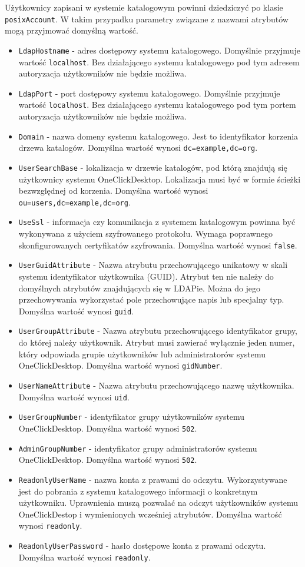 \documentclass[../opis-rozwiazania.tex]{subfiles}
\begin{document}
Użytkownicy zapisani w systemie katalogowym powinni dziedziczyć po klasie \texttt{posixAccount}. W takim przypadku parametry związane z nazwami atrybutów mogą przyjmować domyślną wartość.
\begin{itemize}
  \item \texttt{LdapHostname} - adres dostępowy systemu katalogowego. Domyślnie przyjmuje wartość \texttt{localhost}. Bez działającego systemu katalogowego pod tym adresem autoryzacja użytkowników nie będzie możliwa.
  \item \texttt{LdapPort} - port dostępowy systemu katalogowego. Domyślnie przyjmuje wartość \texttt{localhost}. Bez działającego systemu katalogowego pod tym portem autoryzacja użytkowników nie będzie możliwa.
  \item \texttt{Domain} - nazwa domeny systemu katalogowego. Jest to identyfikator korzenia drzewa katalogów. Domyślna wartość wynosi \texttt{dc=example,dc=org}.
  \item \texttt{UserSearchBase} - lokalizacja w drzewie katalogów, pod którą znajdują się użytkownicy systemu OneClickDesktop. Lokalizacja musi być w formie ścieżki bezwzględnej od korzenia. Domyślna wartość wynosi \texttt{ou=users,dc=example,dc=org}.
  \item \texttt{UseSsl} - informacja czy komunikacja z systemem katalogowym powinna być wykonywana z użyciem szyfrowanego protokołu. Wymaga poprawnego skonfigurowanych certyfikatów szyfrowania. Domyślna wartość wynosi \texttt{false}.
  \item \texttt{UserGuidAttribute} - Nazwa atrybutu przechowującego unikatowy w skali systemu identyfikator użytkownika (GUID). Atrybut ten nie należy do domyślnych atrybutów znajdujących się w LDAPie. Można do jego przechowywania wykorzystać pole przechowujące napis lub specjalny typ. Domyślna wartość wynosi \texttt{guid}.
  \item \texttt{UserGroupAttribute} - Nazwa atrybutu przechowującego identyfikator grupy, do której należy użytkownik. Atrybut musi zawierać wyłącznie jeden numer, który odpowiada grupie użytkowników lub administratorów systemu OneClickDesktop. Domyślna wartość wynosi \texttt{gidNumber}.
  \item \texttt{UserNameAttribute} - Nazwa atrybutu przechowującego nazwę użytkownika. Domyślna wartość wynosi \texttt{uid}.
  \item \texttt{UserGroupNumber} - identyfikator grupy użytkowników systemu OneClickDesktop. Domyślna wartość wynosi \texttt{502}.
  \item \texttt{AdminGroupNumber} - identyfikator grupy administratorów systemu OneClickDesktop. Domyślna wartość wynosi \texttt{502}.
  \item \texttt{ReadonlyUserName} - nazwa konta z prawami do odczytu. Wykorzystywane jest do pobrania z systemu katalogowego informacji o konkretnym użytkowniku. Uprawnienia muszą pozwalać na odczyt użytkowników systemu OneClickDestop i wymienionych wcześniej atrybutów. Domyślna wartość wynosi \texttt{readonly}.
  \item \texttt{ReadonlyUserPassword} - hasło dostępowe konta z prawami odczytu. Domyślna wartość wynosi \texttt{readonly}.
\end{itemize}
\end{document}
